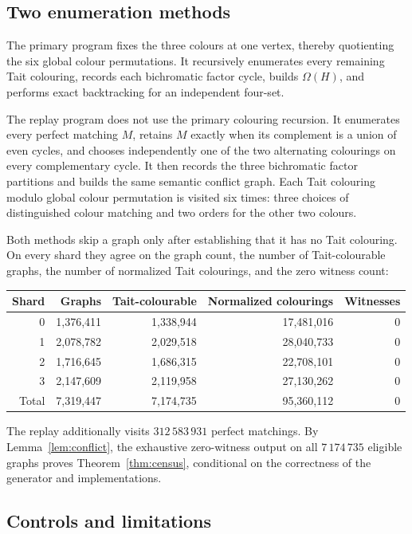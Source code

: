 \documentclass[11pt]{article}
\theoremstyle{definition}
\theoremstyle{remark}
\begin{document}
\subsection{Two enumeration methods}

The primary program fixes the three colours at one vertex, thereby
quotienting the six global colour permutations.  It recursively
enumerates every remaining Tait colouring, records each bichromatic
factor cycle, builds \(\Omega(H)\), and performs exact backtracking for
an independent four-set.

The replay program does not use the primary colouring recursion.  It
enumerates every perfect matching \(M\), retains \(M\) exactly when its
complement is a union of even cycles, and chooses independently one of
the two alternating colourings on every complementary cycle.  It then
records the three bichromatic factor partitions and builds the same
semantic conflict graph.  Each Tait colouring modulo global colour
permutation is visited six times: three choices of distinguished colour
matching and two orders for the other two colours.

Both methods skip a graph only after establishing that it has no Tait
colouring.  On every shard they agree on the graph count, the number of
Tait-colourable graphs, the number of normalized Tait colourings, and
the zero witness count:

\begin{center}
\begin{tabular}{@{}rrrrr@{}}
\toprule
Shard & Graphs & Tait-colourable & Normalized colourings & Witnesses\\
\midrule
0 & 1,376,411 & 1,338,944 & 17,481,016 & 0\\
1 & 2,078,782 & 2,029,518 & 28,040,733 & 0\\
2 & 1,716,645 & 1,686,315 & 22,708,101 & 0\\
3 & 2,147,609 & 2,119,958 & 27,130,262 & 0\\
\midrule
Total & 7,319,447 & 7,174,735 & 95,360,112 & 0\\
\bottomrule
\end{tabular}
\end{center}

The replay additionally visits \(312\,583\,931\) perfect matchings.
By Lemma~\ref{lem:conflict}, the exhaustive zero-witness output on all
\(7\,174\,735\) eligible graphs proves Theorem~\ref{thm:census},
conditional on the correctness of the generator and implementations.

\subsection{Controls and limitations}
\end{document}
